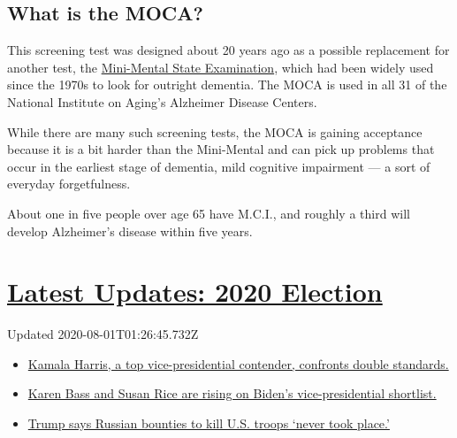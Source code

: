 \hypertarget{what-is-the-moca}{%
\subsection{What is the MOCA?}\label{what-is-the-moca}}

This screening test was designed about 20 years ago as a possible
replacement for another test, the
\href{https://www.uml.edu/docs/Mini\%20Mental\%20State\%20Exam_tcm18-169319.pdf}{Mini-Mental
State Examination}, which had been widely used since the 1970s to look
for outright dementia. The MOCA is used in all 31 of the National
Institute on Aging's Alzheimer Disease Centers.

While there are many such screening tests, the MOCA is gaining
acceptance because it is a bit harder than the Mini-Mental and can pick
up problems that occur in the earliest stage of dementia, mild cognitive
impairment --- a sort of everyday forgetfulness.

About one in five people over age 65 have M.C.I., and roughly a third
will develop Alzheimer's disease within five years.

\hypertarget{latest-updates-2020-election}{%
\section{\texorpdfstring{\href{https://www.nytimes.com/2020/07/31/us/elections/biden-vs-trump.html?action=click\&pgtype=Article\&state=default\&region=MAIN_CONTENT_1\&context=storylines_live_updates}{Latest
Updates: 2020
Election}}{Latest Updates: 2020 Election}}\label{latest-updates-2020-election}}

Updated 2020-08-01T01:26:45.732Z

\begin{itemize}
\tightlist
\item
  \href{https://www.nytimes.com/2020/07/31/us/elections/biden-vs-trump.html?action=click\&pgtype=Article\&state=default\&region=MAIN_CONTENT_1\&context=storylines_live_updates\#link-29fdff45}{Kamala
  Harris, a top vice-presidential contender, confronts double
  standards.}
\item
  \href{https://www.nytimes.com/2020/07/31/us/elections/biden-vs-trump.html?action=click\&pgtype=Article\&state=default\&region=MAIN_CONTENT_1\&context=storylines_live_updates\#link-13ec3d9c}{Karen
  Bass and Susan Rice are rising on Biden's vice-presidential
  shortlist.}
\item
  \href{https://www.nytimes.com/2020/07/31/us/elections/biden-vs-trump.html?action=click\&pgtype=Article\&state=default\&region=MAIN_CONTENT_1\&context=storylines_live_updates\#link-49e9a016}{Trump
  says Russian bounties to kill U.S. troops `never took place.'}
\end{itemize}

